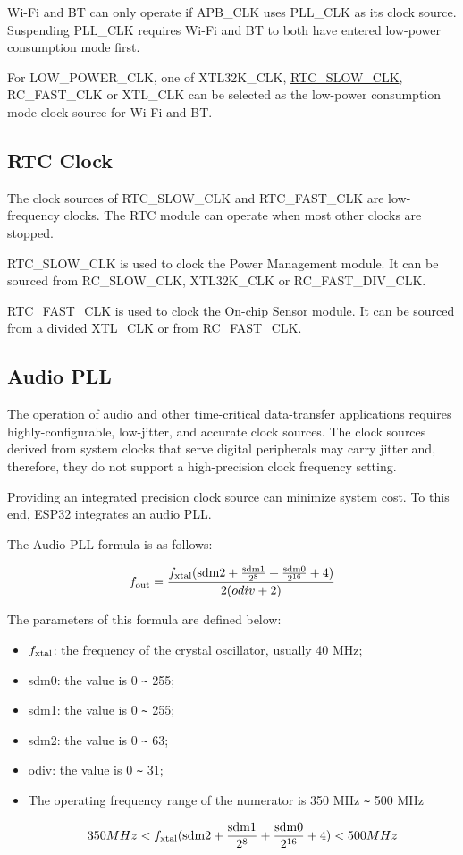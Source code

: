 \documentclass[main\_\_EN.tex]{subfiles}
\begin{document}
Wi-Fi and BT can only operate if APB\_CLK uses PLL\_CLK as its clock source. Suspending PLL\_CLK requires Wi-Fi and BT to both have entered low-power consumption mode first.

For LOW\_POWER\_CLK, one of XTL32K\_CLK, \hyperlink{SLOW_CLK}{RTC\_SLOW\_CLK}, RC\_FAST\_CLK or XTL\_CLK can be selected as the low-power consumption mode clock source for Wi-Fi and BT.

\subsection{RTC Clock}

The clock sources of \hypertarget{SLOW_CLK}{RTC\_SLOW\_CLK} and RTC\_FAST\_CLK are low-frequency clocks. The RTC module can operate when most other clocks are stopped.

RTC\_SLOW\_CLK is used to clock the Power Management module. It can be sourced from RC\_SLOW\_CLK, XTL32K\_CLK or RC\_FAST\_DIV\_CLK.

RTC\_FAST\_CLK is used to clock the On-chip Sensor module. It can be sourced from a divided XTL\_CLK or from RC\_FAST\_CLK.

\subsection{Audio PLL}\label{audiopll}
The operation of audio and other time-critical data-transfer applications requires highly-configurable, low-jitter, and accurate clock sources. The clock sources derived from system clocks that serve digital peripherals may carry jitter and, therefore, they do not support a high-precision clock frequency setting.

Providing an integrated precision clock source can minimize system cost. To this end, ESP32 integrates an audio PLL.


The Audio PLL formula is as follows:

\[
f_{\rm{out}} = \frac{f_{\rm{xtal}}(\rm{sdm2}+\frac{\rm{sdm1}}{2^8}+\frac{\rm{sdm0}}{2^{16}}+4)}{2(odiv+2)}
\]

The parameters of this formula are defined below:
\begin{itemize}
    \item \begin{math}f_{\rm{xtal}}\end{math}: the frequency of the crystal oscillator, usually 40 MHz;
    \item sdm0: the value is 0 \verb+~+ 255;
    \item sdm1: the value is 0 \verb+~+ 255;
    \item sdm2: the value is 0 \verb+~+ 63;
    \item odiv: the value is 0 \verb+~+ 31;
    \item The operating frequency range of the numerator is 350 MHz \verb+~+ 500 MHz

\[
350 MHz<{f_{\rm{xtal}}(\rm{sdm2}+\frac{\rm{sdm1}}{2^8}+\frac{\rm{sdm0}}{2^{16}}+4)}<500 MHz
\]

\end{itemize}
\end{document}
